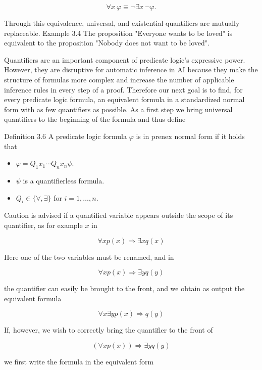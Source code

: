 \documentclass[10pt]{book}
\begin{document}
$$
\forall x \ \varphi \equiv \neg \exists x \ \neg \varphi .
$$

Through this equivalence, universal, and existential quantifiers are mutually replaceable.
Example 3.4 The proposition "Everyone wants to be loved" is equivalent to the proposition "Nobody does not want to be loved".

Quantifiers are an important component of predicate logic's expressive power. However, they are disruptive for automatic inference in AI because they make the structure of formulas more complex and increase the number of applicable inference rules in every step of a proof. Therefore our next goal is to find, for every predicate logic formula, an equivalent formula in a standardized normal form with as few quantifiers as possible. As a first step we bring universal quantifiers to the beginning of the formula and thus define

Definition 3.6 A predicate logic formula $\varphi$ is in prenex normal form if it holds that

\begin{itemize}
  \item $\varphi=Q_{1} x_{1} \cdots Q_{n} x_{n} \psi$.
  \item $\psi$ is a quantifierless formula.
  \item $Q_{i} \in\{\forall, \exists\}$ for $i=1, \ldots, n$.
\end{itemize}

Caution is advised if a quantified variable appears outside the scope of its quantifier, as for example $x$ in

$$
\forall x p(x) \Rightarrow \exists x q(x)
$$

Here one of the two variables must be renamed, and in

$$
\forall x p(x) \Rightarrow \exists y q(y)
$$

the quantifier can easily be brought to the front, and we obtain as output the equivalent formula

$$
\forall x \exists y p(x) \Rightarrow q(y)
$$

If, however, we wish to correctly bring the quantifier to the front of

\begin{equation*}
(\forall x p(x)) \Rightarrow \exists y q(y) \tag{3.4}
\end{equation*}

we first write the formula in the equivalent form
\end{document}
